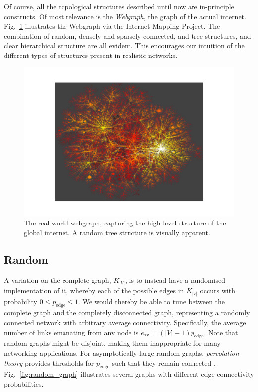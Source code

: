 \documentclass[aps,rmp,twocolumn,amsmath,amssymb,nofootinbib,superscriptaddress,longbibliography,floatfix]{revtex4-1}
\newcommand{\comment}[1]{{\color{blue}{\textbf{#1}}}}
\begin{document}
Of course, all the topological structures described until now are in-principle constructs. Of most relevance is the \emph{Webgraph}, the graph of the actual internet. Fig.~\ref{fig:webgraph} illustrates the Webgraph via the Internet Mapping Project. The combination of random, densely and sparsely connected, and tree structures, and clear hierarchical structure are all evident. This encourages our intuition of the different types of structures present in realistic networks.

\begin{figure}[!htb]
\includegraphics[width=\columnwidth]{webgraph}
\caption{The real-world webgraph, capturing the high-level structure of the global internet. A random tree structure is visually apparent. \comment{CITE THE SOURCE! Is it open source?}} \label{fig:webgraph}
\end{figure}

%
%

\subsection{Random}

A variation on the complete graph, $K_{|V|}$, is to instead have a randomised implementation of it, whereby each of the possible edges in $K_{|V|}$ occurs with probability \mbox{$0\leq p_\mathrm{edge}\leq 1$}. We would thereby be able to tune between the complete graph and the completely disconnected graph, representing a randomly connected network with arbitrary average connectivity. Specifically, the average number of links emanating from any node is \mbox{$e_\mathrm{av} = (|V|-1)p_\mathrm{edge}$}. Note that random graphs might be disjoint, making them inappropriate for many networking applications. For asymptotically large random graphs, \emph{percolation theory} \cite{???} provides thresholds for $p_\mathrm{edge}$ such that they remain connected \cite{???}. Fig.~\ref{fig:random_graph} illustrates several graphs with different edge connectivity probabilities.
\end{document}

